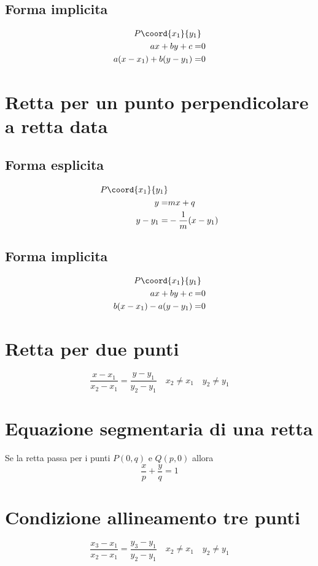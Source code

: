 \subsection{Forma implicita}
\begin{align*}
P\coord{x_1}{y_1}&\nonumber\\
ax+by+c=&0\nonumber\\
a(x-x_1)+b(y-y_1)=&0
\end{align*}
\section{Retta per un punto perpendicolare a retta data}
\subsection{Forma esplicita}
\begin{align*}
P\coord{x_1}{y_1}&\nonumber\\
y=&mx+q\nonumber\\
y-y_1=&-\dfrac{1}{m}(x-y_1)
\end{align*}
\subsection{Forma implicita}
\begin{align*}
P\coord{x_1}{y_1}&\nonumber\\
ax+by+c=&0\nonumber\\
b(x-x_1)-a(y-y_1)=&0
\end{align*}
\section{Retta per due punti}
\begin{equation*}
\dfrac{x-x_1}{x_2-x_1}=\dfrac{y-y_1}{y_2-y_1}\quad x_2\neq x_1\quad y_2\neq y_1
\end{equation*}
\section{Equazione segmentaria di una retta}
Se la retta passa per i punti $P(0,q)$ e $Q(p,0)$ allora 
\begin{equation*}
\dfrac{x}{p}+\dfrac{y}{q}=1
\end{equation*}
\section{Condizione allineamento tre  punti}
\begin{equation*}
\dfrac{x_3-x_1}{x_2-x_1}=\dfrac{y_3-y_1}{y_2-y_1}\quad x_2\neq x_1\quad y_2\neq y_1
\end{equation*}
